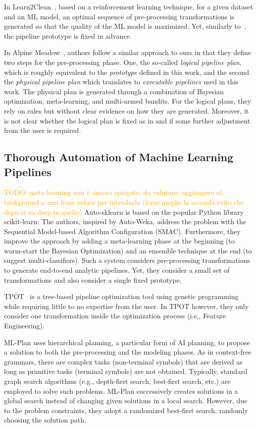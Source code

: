 In Learn2Clean~\cite{Berti19WWW}, based on a reinforcement learning technique, for a given dataset and an ML model, an optimal sequence of pre-processing transformations is generated so that the quality of the ML model is maximized.
Yet, similarly to~\cite{Quemy20InfSystems}, the pipeline prototype is fixed in advance.

In Alpine Meadow~\cite{Shang19SIGMOD}, authors follow a similar approach to ours in that they define two steps for the pre-processing phase. One, the so-called \textit{logical pipeline plan}, which is roughly equivalent to the \textit{prototype} defined in this work, and the second the \textit{physical pipeline plan} which translates to \textit{executable pipelines} used in this work.
The physical plan is generated through a combination of Bayesian optimization, meta-learning, and multi-armed bandits.
For the logical plans, they rely on rules but without clear evidence on how they are generated.
Moreover, it is not clear whether the logical plan is fixed as in \cite{Quemy20InfSystems} and if some further adjustment from the user is required.

\subsection{Thorough Automation of Machine Learning Pipelines}
\label{effective-ssec:dpso-cash}
\textcolor{orange}{TODO: meta-learning non è ancora spiegato, da valutare: aggiungere al background o una frase veloce per introdurlo (forse meglio la seconda vsito che dopo si va deep in quello)}
Auto-sklearn \cite{Feurer15AutoSklearn} is based on the popular Python library scikit-learn.
The authors, inspired by Auto-Weka, address the problem with the Sequential Model-based Algorithm Configuration (SMAC).
Furthermore, they improve the approach by adding a meta-learning phase at the beginning (to warm-start the Bayesian Optimization) and an ensemble technique at the end (to suggest multi-classifiers).
Such a system considers pre-processing transformations to generate end-to-end analytic pipelines.
Yet, they consider a small set of transformations and also consider a single fixed prototype.

TPOT~\cite{Olson16Tpot} is a tree-based pipeline optimization tool using genetic programming while requiring little to no expertise from the user.
In TPOT however, they only consider one transformation inside the optimization process (i.e., Feature Engineering).

ML-Plan \cite{mohr2018ml} uses hierarchical planning, a particular form of AI planning, to propose a solution to both the pre-processing and the modeling phases.
As in context-free grammars, there are complex tasks (non-terminal symbols) that are derived as long as primitive tasks (terminal symbols) are not obtained.
Typically, standard graph search algorithms (e.g., depth-first search, best-first search, etc.) are employed to solve such problems.
ML-Plan successively creates solutions in a global search instead of changing given solutions in a local search. However, due to the problem constraints, they adopt a randomized best-first search, randomly choosing the solution path.

